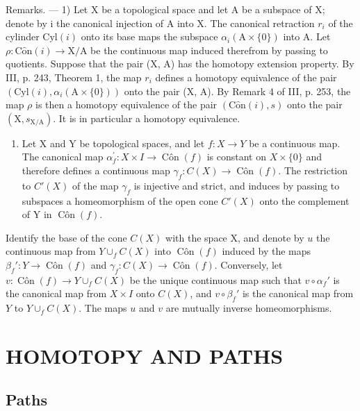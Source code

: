 Remarks. --- 1) Let X be a topological space and let A be a subspace of X; denote by i the canonical injection of A into X. The canonical retraction \(r_{i}\) of the cylinder \(\mathrm{Cyl}(i)\) onto its base maps the subspace \(\alpha_{i}(\mathrm{A} \times \{0\})\) into A. Let \(\rho: \mathrm{C}\hat{\mathrm{o}}\mathrm{n}(i) \to \mathrm{X}/\mathrm{A}\) be the continuous map induced therefrom by passing to quotients. Suppose that the pair (X, A) has the homotopy extension property. By III, p. 243, Theorem 1, the map \(r_{i}\) defines a homotopy equivalence of the pair \((\mathrm{Cyl}(i), \alpha_{i}(\mathrm{A} \times \{0\}))\) onto the pair (X, A). By Remark 4 of III, p. 253, the map \(\rho\) is then a homotopy equivalence of the pair \((\mathrm{C}\hat{\mathrm{o}}\mathrm{n}(i), s)\) onto the pair \((\mathrm{X}, s_{\mathrm{X}/\mathrm{A}})\). It is in particular a homotopy equivalence.

\begin{enumerate}
\def\labelenumi{\arabic{enumi})}
\setcounter{enumi}{1}
\tightlist
\item
  Let X and Y be topological spaces, and let \(f\colon X \to Y\) be a continuous map. The canonical map \(\alpha_{f}^{\prime}\colon X \times I \to \operatorname{Côn}(f)\) is constant on \(X \times \{0\}\) and therefore defines a continuous map \(\gamma_{f}\colon C(X) \to \operatorname{Côn}(f)\). The restriction to \(C'(X)\) of the map \(\gamma_{f}\) is injective and strict, and induces by passing to subspaces a homeomorphism of the open cone \(C'(X)\) onto the complement of Y in \(\operatorname{Côn}(f)\).
\end{enumerate}

Identify the base of the cone \(C(X)\) with the space X, and denote by \(u\) the continuous map from \(Y \cup_f C(X)\) into \(\operatorname{Côn}(f)\) induced by the maps \(\beta_f':Y\to\operatorname{Côn}(f)\) and \(\gamma_f:C(X)\to\operatorname{Côn}(f)\). Conversely, let \(v:\operatorname{Côn}(f)\to Y\cup_f C(X)\) be the unique continuous map such that \(v\circ\alpha_f'\) is the canonical map from \(X\times I\) onto \(C(X)\), and \(v\circ\beta_f'\) is the canonical map from \(Y\) to \(Y\cup_f C(X)\). The maps \(u\) and \(v\) are mutually inverse homeomorphisms.

\section{HOMOTOPY AND PATHS}

\subsection{Paths}

